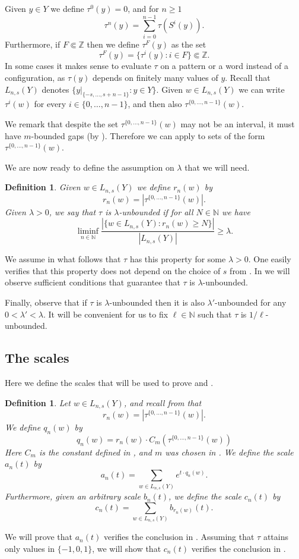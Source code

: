 \documentclass[a4paper,oneside]{amsart}
\renewcommand{\(}{\begin{dmath*}}
\renewcommand{\)}{\end{dmath*}}
\newtheorem{definition}[theorem]{Definition}
\theoremstyle{definition}
\newcommand{\N}{\mathbb{N}}
\newcommand{\Z}{\mathbb{Z}}
\begin{document}
Given $y\in Y$ we define $\tau^0(y)=0$,  and for $n\geq 1$ 
\[\tau^n(y) = \sum_{i=0}^{n-1}\tau(S^i(y)). \]
Furthermore, if $F\Subset \Z$ then we define $\tau^F(y)$ as the set
\[\tau^F(y)=\{\tau^i(y) : i\in F\}\Subset\Z.\]   
In some cases it makes sense to evaluate $\tau$ on a pattern or a word instead of a configuration, as $\tau(y)$ depends on finitely many values of $y$. Recall that $L_{n,s}(Y)$ denotes $\{y|_{\{-s,\dots,s+n-1\}} : y\in Y\}$. Given $w\in L_{n,s}(Y)$ we can write  $\tau^i(w)$ for every $i\in \{0,\dots,n-1\}$, and then also $\tau^{\{0,\dots,n-1\}}(w)$. 

We remark that despite the set $\tau^{\{0,\dots,n-1\}}(w)$ may not be an interval, it must have $m$-bounded gaps (by ). Therefore we can apply  to sets of the form $\tau^{\{0,\dots,n-1\}}(w)$.

We are now ready to define the assumption on $\lambda$ that we will need.
\begin{definition}\label{def:good}\label{lambda-unbounded}
    Given $w\in L_{n,s}(Y)$ we define $r_n(w)$ by 
    \[r_n(w)=|\tau^{\{0,\dots,n-1\}}(w)|.\]
    Given $\lambda>0$, we say that $\tau$ is $\lambda$-unbounded if for
    all $N\in\N$ we have
\[\liminf_{n\in\N}\frac{|\{w\in L_{n,s}(Y) : r_n(w)\geq N\}|}{|L_{n,s}(Y)|}\geq \lambda.\]
\end{definition}
We assume in what follows that $\tau$ has this property for some $\lambda>0$. One easily verifies that this property does not depend on the choice of $s$ from . In  we will observe  sufficient conditions that guarantee that $\tau$ is $\lambda$-unbounded. %


Finally, observe that if $\tau$ is $\lambda$-unbounded then it is also $\lambda'$-unbounded for any $0<\lambda'<\lambda$. It will be convenient for us to fix $\ell\in\N$ such that $\tau$ is $1/\ell$-unbounded. 

\subsection{The scales}
Here we define the scales that will be used to prove  and . 
\begin{definition}\label{def:scales}
Let $w\in L_{n,s}(Y)$, and recall from  that
\[r_n(w)= |\tau^{\{0,\dots,n-1\}}(w)|.\]
We define $q_n(w)$ by 
\[q_n(w)=r_n(w)\cdot C_m(\tau^{\{0,\dots,n-1\}}(w))\]
Here $C_m$ is the constant defined in , and $m$ was chosen in . We define the scale $a_n(t)$ by
\[a_n(t)=\sum_{w\in L_{n,s}(Y)}e^{t\cdot q_n(w)}.\]
Furthermore, given an arbitrary scale $b_n(t)$, we define the scale $c_n(t)$ by 
\[c_n(t)=\sum_{w\in L_{n,s}(Y)}b_{r_n(w)}(t).\]
\end{definition}
We will prove that $a_n(t)$ verifies the conclusion in . Assuming that $\tau$ attains only values in $\{-1,0,1\}$, we will show  that $c_n(t)$ verifies the conclusion in .
\end{document}
